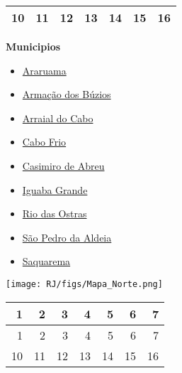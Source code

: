 \documentclass[10pt]{article} %
\begin{document}
\begin{minipage}[t]{.66\linewidth}
\begin{center}
\begin{tabular}{rrrrrrr}
   10 &  11 &  12 &  13 &  14 &  15 &  16 \\ 
   \hline
\end{tabular}
\end{center}
\end{minipage}\hfill\begin{minipage}[t]{.30\linewidth}
\begin{mdframed}[style=sidebar,frametitle={}]
\textbf{Municipios}\begin{itemize}\item \hyperlink{https:/alerta.dengue.mat.br/alerta/3300209}{Araruama}
\item \hyperlink{https:/alerta.dengue.mat.br/alerta/3300233}{Armação dos Búzios}
\item \hyperlink{https:/alerta.dengue.mat.br/alerta/3300258}{Arraial do Cabo}
\item \hyperlink{https:/alerta.dengue.mat.br/alerta/3300704}{Cabo Frio}
\item \hyperlink{https:/alerta.dengue.mat.br/alerta/3301306}{Casimiro de Abreu}
\item \hyperlink{https:/alerta.dengue.mat.br/alerta/3301876}{Iguaba Grande}
\item \hyperlink{https:/alerta.dengue.mat.br/alerta/3304524}{Rio das Ostras}
\item \hyperlink{https:/alerta.dengue.mat.br/alerta/3305208}{São Pedro da Aldeia}
\item \hyperlink{https:/alerta.dengue.mat.br/alerta/3305505}{Saquarema}
\end{itemize}\end{mdframed}\hfill\end{minipage}\newpage\begin{minipage}[t]{.66\linewidth}
\hypertarget{ Nort }{}
\texttt{[image: RJ/figs/Mapa\_Norte.png]}\vspace{0.5cm}\begin{center}
\begin{tabular}{rrrrrrr}
  \hline
1 & 2 & 3 & 4 & 5 & 6 & 7 \\ 
  \hline
  1 &   2 &   3 &   4 &   5 &   6 &   7 \\ 
   10 &  11 &  12 &  13 &  14 &  15 &  16 \\ 
   \hline
\end{tabular}
\end{center}

\end{minipage}
\end{document}
